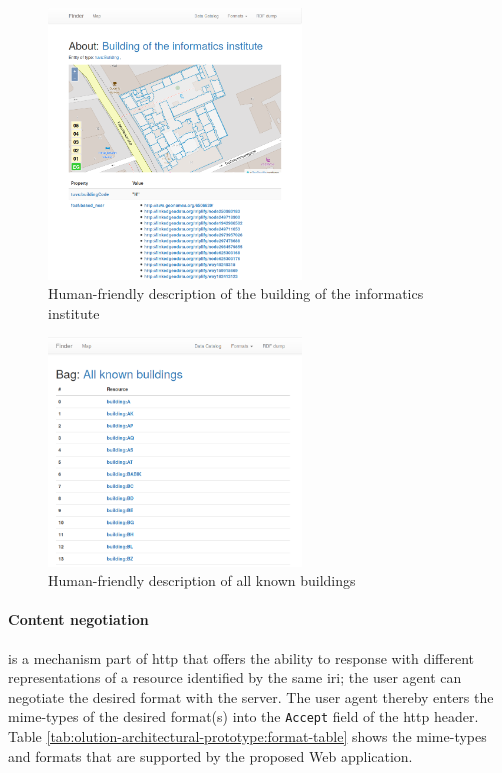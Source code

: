\documentclass[draft,final]{vutinfth} %
\begin{document}
\begin{figure}[h]
    \centering
    \includegraphics[width=0.6\textwidth]{graphics/solution/app/building_description.png}
    \caption{Human-friendly description of the building of the informatics institute}
    \label{fig:solution-architectural-prototype:page-building}
\end{figure}

\begin{figure}[h]
    \centering
    \includegraphics[width=0.6\textwidth]{graphics/solution/app/allbuildings_description.png}
    \caption{Human-friendly description of all known buildings}
    \label{fig:solution-architectural-prototype:page-all-buildings}
\end{figure}

\paragraph{Content negotiation} is a mechanism part of \gls{http} that offers the ability to response with different representations of a resource identified by the same \gls{iri}; the user agent can negotiate the desired format with the server. The user agent thereby enters the mime-types of the desired format(s) into the \texttt{Accept} field of the \gls{http} header. Table \ref{tab:olution-architectural-prototype:format-table} shows the mime-types and formats that are supported by the proposed Web application. 
\end{document}
